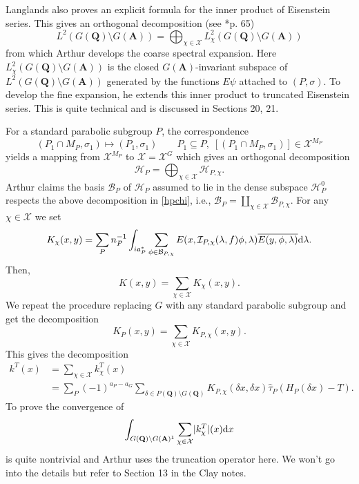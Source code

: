 \documentclass[11pt]{amsart}
\def\apg{a_{P} - a_{G}}
\def\A{\mathbf A}
\def\Q{\mathbf Q}
\def\BBB{\mathcal B}
\def\HHH{\mathcal H}
\def\III{\mathcal I}
\def\XXX{\mathcal X}
\def\aaa{\mathfrak a}
\def\d{\text d}
\def\bs{\setminus} 			%
\def\Ltwo{L^2}
\def\mod#1{\lvert #1 \rvert} %
\theoremstyle{remark}
\begin{document}
Langlands also proves an explicit formula for the inner product of Eisenstein series. This gives an orthogonal decomposition (see \cite{clay}*{p. 65})
\begin{equation} \label{hpchi}
	\Ltwo(G(\Q)\bs G(\A)) = \bigoplus_{\chi \in \XXX} \Ltwo_\chi(G(\Q)\bs G(\A))
\end{equation}
from which Arthur develops the coarse spectral expansion. Here $\Ltwo_\chi(G(\Q)\bs G(\A))$ is the closed $G(\A)$-invariant subspace of $\Ltwo(G(\Q)\bs G(\A))$ generated by the functions $E\psi$ attached to $(P, \sigma)$. To develop the fine expansion, he extends this inner product to truncated Eisenstein series. This is quite technical and is discussed in Sections 20, 21. 

For a standard parabolic subgroup $P$, the correspondence
\[ (P_1\cap M_P, \sigma_1) \mapsto (P_1, \sigma_1) \qquad P_1 \subseteq P, \; [(P_1 \cap M_P, \sigma_1)] \in \XXX^{M_P} \]
yields a mapping from $\XXX^{M_P}$ to $\XXX = \XXX^G$ which gives an orthogonal decomposition
\[ \HHH_P = \bigoplus_{\chi \in \XXX} \HHH_{P, \chi}. \]
Arthur claims the basis $\BBB_P$ of $\HHH_P$ assumed to lie in the dense subspace $\HHH_P^0$ respects the above decomposition in \cref{hpchi}, i.e., $\BBB_P = \coprod_{\chi \in \XXX} \BBB_{P, \chi}$. For any $\chi \in \XXX$ we set
\[ K_\chi(x, y) = \sum_P n_P^{-1} \int_{i\aaa_P^*} \sum_{\phi \in \BBB_{P, \chi}}
		E(x, \III_{P, \chi}(\lambda, f)\phi, \lambda) \overline{E(y, \phi, \lambda)} \d \lambda. \]
Then,
\[ K(x, y) = \sum_{\chi \in \XXX} K_\chi(x, y). \]
We repeat the procedure replacing $G$ with any standard parabolic subgroup and get the decomposition 
\[ K_P(x, y) = \sum_{\chi \in \XXX} K_{P, \chi}(x, y). \]
This gives the decomposition
\begin{align*}
	k^T(x) & = \sum_{\chi \in \XXX} k_\chi^T(x) \\
			& = \sum_P (-1)^{\apg} \sum_{\delta \in P(\Q)\bs G(\Q)} K_{P, \chi}(\delta x, \delta x)
				\hat\tau_P(H_P(\delta x) - T).
\end{align*}
To prove the convergence of 
\[ \int_{G(\Q)\bs G(\A)^1} \sum_{\chi \in \XXX} \mod{k_\chi^T}(x) \d x \]
is quite nontrivial and Arthur uses the truncation operator here. We won't go into the details but refer to Section 13 in the Clay notes. 
\end{document}

